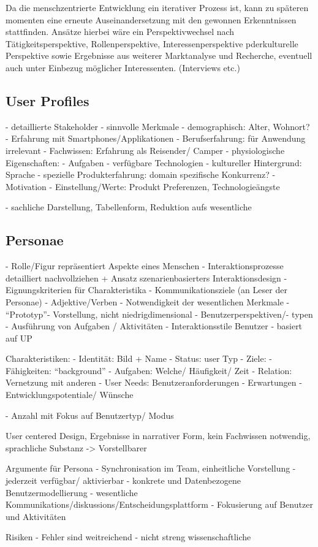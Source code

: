 Da die menschzentrierte Entwicklung ein iterativer Prozess ist, kann zu späteren momenten eine erneute Auseinandersetzung mit den gewonnen Erkenntnissen stattfinden.
Ansätze hierbei wäre ein Perspektivwechsel nach Tätigkeitsperspektive, Rollenperspektive, Interessenperspektive pderkulturelle Perspektive sowie Ergebnisse aus weiterer Marktanalyse und Recherche, eventuell auch unter Einbezug möglicher Interessenten. (Interviews etc.)
 

 \subsection{User Profiles}

- detaillierte Stakeholder
- sinnvolle Merkmale
- demographisch: Alter, Wohnort?
- Erfahrung mit Smartphones/Applikationen
- Berufserfahrung: für Anwendung irrelevant
- Fachwissen: Erfahrung als Reisender/ Camper
- physiologische Eigenschaften:
- Aufgaben
- verfügbare Technologien
- kultureller Hintergrund: Sprache
- spezielle Produkterfahrung: domain spezifische Konkurrenz?
- Motivation
- Einstellung/Werte:  Produkt Preferenzen, Technologieängste
 
- sachliche Darstellung, Tabellenform, Reduktion aufs wesentliche


  \subsection{Personae}

- Rolle/Figur repräsentiert Aspekte eines Menschen
- Interaktionsprozesse detailliert nachvollziehen + Ansatz szenarienbasierters Interaktionsdesign
- Eignungskriterien für Charakteristika
          - Kommunikationsziele (an Leser der Personae)
          - Adjektive/Verben
          - Notwendigkeit der wesentlichen Merkmale
          - “Prototyp”- Vorstellung, nicht niedrigdimensional
- Benutzerperspektiven/- typen
- Ausführung von Aufgaben / Aktivitäten
- Interaktionsstile Benutzer
- basiert auf UP
 
Charakteristiken:
          - Identität: Bild + Name
          - Status: user Typ
          - Ziele:
          - Fähigkeiten: “background”
          - Aufgaben: Welche/ Häufigkeit/ Zeit
          - Relation: Vernetzung mit anderen
          - User Needs: Benutzeranforderungen
          - Erwartungen
          - Entwicklungspotentiale/ Wünsche
 
- Anzahl mit Fokus auf Benutzertyp/ Modus
 
 
User centered Design, Ergebnisse in narrativer Form, kein Fachwissen notwendig, sprachliche Substanz -> Vorstellbarer
 
Argumente für Persona
          - Synchronisation im Team, einheitliche Vorstellung
          - jederzeit verfügbar/ aktivierbar
          - konkrete und Datenbezogene Benutzermodellierung
          - wesentliche Kommunikations/diskussions/Entscheidungsplattform
          - Fokusierung auf Benutzer und Aktivitäten
 
Risiken
          - Fehler sind weitreichend
          - nicht streng wissenschaftliche


